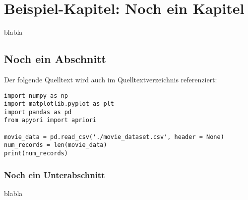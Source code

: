 \chapter{Beispiel-Kapitel: Noch ein Kapitel}

blabla

\section{Noch ein Abschnitt}

Der folgende Quelltext wird auch im Quelltextverzeichnis referenziert:

\begin{lstlisting}[caption={\texttt{PrintMovieDB.py}},captionpos=b]
import numpy as np  
import matplotlib.pyplot as plt  
import pandas as pd  
from apyori import apriori

movie_data = pd.read_csv('./movie_dataset.csv', header = None)
num_records = len(movie_data)
print(num_records)
\end{lstlisting}

\subsection{Noch ein Unterabschnitt}	

blabla
